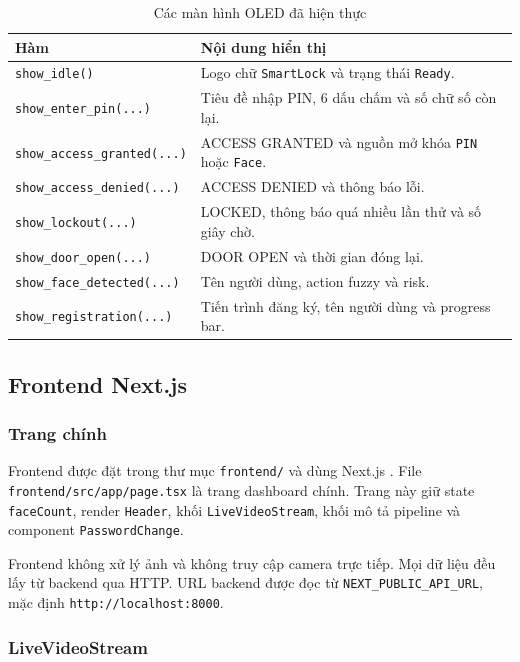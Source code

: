 \begin{table}[H]
\centering
\caption{Các màn hình OLED đã hiện thực}
\label{tab:oled_screens}
\begin{tabularx}{\textwidth}{|l|X|}
\hline
\textbf{Hàm} & \textbf{Nội dung hiển thị} \\
\hline
\texttt{show\_idle()} & Logo chữ \texttt{SmartLock} và trạng thái \texttt{Ready}. \\
\hline
\texttt{show\_enter\_pin(...)} & Tiêu đề nhập PIN, 6 dấu chấm và số chữ số còn lại. \\
\hline
\texttt{show\_access\_granted(...)} & ACCESS GRANTED và nguồn mở khóa \texttt{PIN} hoặc \texttt{Face}. \\
\hline
\texttt{show\_access\_denied(...)} & ACCESS DENIED và thông báo lỗi. \\
\hline
\texttt{show\_lockout(...)} & LOCKED, thông báo quá nhiều lần thử và số giây chờ. \\
\hline
\texttt{show\_door\_open(...)} & DOOR OPEN và thời gian đóng lại. \\
\hline
\texttt{show\_face\_detected(...)} & Tên người dùng, action fuzzy và risk. \\
\hline
\texttt{show\_registration(...)} & Tiến trình đăng ký, tên người dùng và progress bar. \\
\hline
\end{tabularx}
\end{table}

\subsection{Frontend Next.js}

\subsubsection{Trang chính}

Frontend được đặt trong thư mục \texttt{frontend/} và dùng Next.js \cite{nextjs}. File \texttt{frontend/src/app/page.tsx} là trang dashboard chính. Trang này giữ state \texttt{faceCount}, render \texttt{Header}, khối \texttt{LiveVideoStream}, khối mô tả pipeline và component \texttt{PasswordChange}.

Frontend không xử lý ảnh và không truy cập camera trực tiếp. Mọi dữ liệu đều lấy từ backend qua HTTP. URL backend được đọc từ \texttt{NEXT\_PUBLIC\_API\_URL}, mặc định \texttt{http://localhost:8000}.

\subsubsection{LiveVideoStream}

